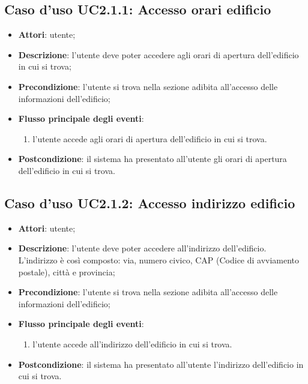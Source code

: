 \documentclass[../AnalisiDeiRequisiti.tex]{subfiles}
\begin{document}
\subsection{Caso d'uso UC2.1.1: Accesso orari edificio}
\begin{itemize}
	\item \textbf{Attori}: utente;
	\item \textbf{Descrizione}: l'utente deve poter accedere agli orari di apertura dell'edificio in cui si trova; 
	\item \textbf{Precondizione}: l'utente si trova nella sezione adibita all'accesso delle informazioni dell'edificio;
	
	\item \textbf{Flusso principale degli eventi}:
	\begin{enumerate}
		\item l'utente accede agli orari di apertura dell'edificio in cui si trova.
		
	\end{enumerate}
	\item \textbf{Postcondizione}: il sistema ha presentato all'utente gli orari di apertura dell'edificio in cui si trova.
\end{itemize}
\hypertarget{UC2.1.2}{}
\subsection{Caso d'uso UC2.1.2: Accesso indirizzo edificio}
\begin{itemize}
	\item \textbf{Attori}: utente;
	\item \textbf{Descrizione}: l'utente deve poter accedere all'indirizzo dell'edificio. L'indirizzo è così composto: via, numero civico, CAP (Codice di avviamento postale), città e provincia; 
	\item \textbf{Precondizione}: l'utente si trova nella sezione adibita all'accesso delle informazioni dell'edificio;
	
	\item \textbf{Flusso principale degli eventi}:
	\begin{enumerate}
		\item l'utente accede all'indirizzo dell'edificio in cui si trova.
		
	\end{enumerate}
	\item \textbf{Postcondizione}: il sistema ha presentato all'utente l'indirizzo dell'edificio in cui si trova.
\end{itemize}
\hypertarget{UC2.1.3}{}
\end{document}
